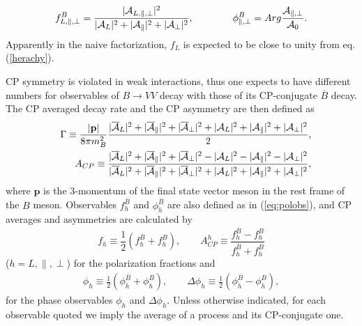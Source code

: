 \documentclass[11pt]{article}
\begin{document}
\begin{equation} \label{eq:polobs}
  f^{ B}_{L,\parallel,\perp} = \frac{|{\cal A}_{L,\parallel,\perp}|^2}
  {  |{\cal A}_L|^2+|{\cal A}_\parallel|^2 + |{\cal A}_\perp|^2},
  \qquad\qquad
  \phi^{B}_{\parallel,\perp} = Arg\frac{{\cal A}_{\parallel,\perp}}{{\cal A}_0}.
\end{equation}
Apparently in the naive factorization, $f_L$ is expected to be close to unity from  eq.(\ref{herachy}).

CP symmetry is violated in weak interactions, thus one  expects to have different numbers for observables of   $B\to VV$ decay with those of its CP-conjugate $\overline B$ decay.    The CP averaged decay rate and the   CP asymmetry are then defined as
\begin{eqnarray}
   && \Gamma \equiv\frac{|\mathbf{p}|}{8\pi m_B^2} \frac{|\overline{\cal A}_L|^2+|\overline{\cal A}_\parallel|^2 + |\overline{\cal A}_\perp|^2 +|{\cal A}_L|^2+|{\cal A}_\parallel|^2 + |{\cal A}_\perp|^2}{2},\\
    &&A_{CP}\equiv \frac{|\overline{\cal A}_L|^2+|\overline{\cal A}_\parallel|^2 +|\overline{\cal A}_\perp|^2 -|{\cal A}_L|^2-|{\cal A}_\parallel|^2 - |{\cal A}_\perp|^2}{|\overline{\cal A}_L|^2+|\overline{\cal A}_\parallel|^2 + |\overline{\cal A}_\perp|^2 +|{\cal A}_L|^2+|{\cal A}_\parallel|^2 + |{\cal A}_\perp|^2},
\end{eqnarray}
where $\mathbf{p}$ is the 3-momentum of the final state vector meson in the rest frame of the $B$ meson.
Observables $f_h^{\overline B}$ and $\phi^{\overline B}_h$ are also defined as in (\ref{eq:polobs}), and CP averages and asymmetries are calculated by
\begin{equation}
    f_h \equiv \frac{1}{2} \left( f_h^{\overline B}+f_h^{B} \right),
    \qquad
    A_{CP}^{h} \equiv \frac{f_h^{\overline B}-f_h^{B}}{f_h^{\overline B}+f_h^{B}}
\end{equation}
($h=L,\parallel,\perp$) for the polarization fractions and
\begin{equation}
  \begin{aligned}
    \phi_h \equiv\frac{1}{2} \left( \phi_h^{\overline B}+\phi_h^{B} \right),  \qquad
    \Delta\phi_h \equiv \frac{1}{2} \left( \phi_h^{\overline B}-\phi_h^{B} \right),
  \end{aligned}\label{phasedef}
\end{equation}
for the phase observables $\phi_h$ and $\Delta\phi_h$. Unless otherwise indicated, for each observable quoted we imply the average of a process and its CP-conjugate one.
\end{document}
